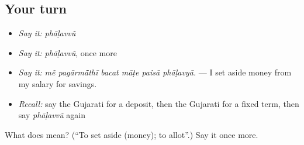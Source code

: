 \subsection*{Your turn}
\begin{itemize}
\raggedright
  \item \emph{Say it:} \emph{phāḷavvũ}
  \item \emph{Say it:} \emph{phāḷavvũ}, once more
  \item \emph{Say it:} \emph{mẽ pagārmā̃thī bacat māṭe paisā phāḷavyā.} — I set aside money from my salary for savings.
  \item \emph{Recall:} say the Gujarati for a deposit, then the Gujarati for a fixed term, then say \emph{phāḷavvũ} again
\end{itemize}

\begin{tcolorbox}[breakable,colback=teal!4,colframe=teal!35!black,title={Before you move on}]
What does  mean? (\textquotedblleft{}To set aside (money); to allot\textquotedblright{}.) Say it once more.
\end{tcolorbox}

